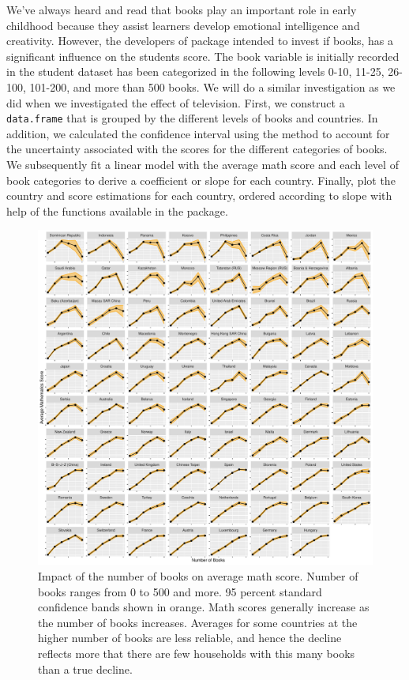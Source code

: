 We've always heard and read that books play an important role in early
childhood because they assist learners develop emotional intelligence
and creativity. However, the developers of 
package intended to invest if books, has a significant influence on the
students score. The book variable is initially recorded in the student
dataset has been categorized in the following levels 0-10, 11-25,
26-100, 101-200, and more than 500 books. We will do a similar
investigation as we did when we investigated the effect of television.
First, we construct a \texttt{data.frame} that is grouped by the
different levels of books and countries. In addition, we calculated the
confidence interval using the method to account for the uncertainty
associated with the scores for the different categories of books. We
subsequently fit a linear model with the average math score and each
level of book categories to derive a coefficient or slope for each
country. Finally, plot the country and score estimations for each
country, ordered according to slope with help of the functions available
in the  \citep{ggplot2} package.

\begin{Schunk}
\begin{figure}[H]
\includegraphics[width=1\linewidth]{learningtower_files/figure-latex/book-plot-1} \caption[Impact of the number of books on average math score]{Impact of the number of books on average math score. Number of books ranges from 0 to 500 and more. 95 percent standard confidence bands shown in orange. Math scores generally increase as the number of books increases. Averages for some countries at the higher number of books are less reliable, and hence the decline reflects more that there are few households with this many books than a true decline.}\label{fig:book-plot}
\end{figure}
\end{Schunk}

